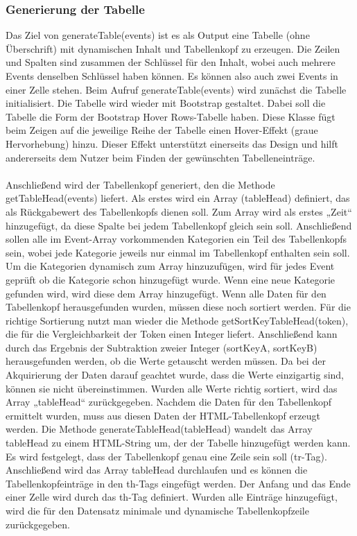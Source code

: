 {\subsubsection{Generierung der Tabelle}
Das Ziel von generateTable(events) ist es als Output eine Tabelle (ohne Überschrift) mit dynamischen Inhalt und Tabellenkopf zu erzeugen. Die Zeilen und Spalten sind zusammen der Schlüssel für den Inhalt, wobei auch mehrere Events denselben Schlüssel haben können. Es können also auch zwei Events in einer Zelle stehen. 
Beim Aufruf generateTable(events) wird zunächst die Tabelle initialisiert. Die Tabelle wird wieder mit Bootstrap gestaltet. Dabei soll die Tabelle die Form der Bootstrap Hover Rows-Tabelle haben. Diese Klasse fügt beim Zeigen auf die jeweilige Reihe der Tabelle einen Hover-Effekt (graue Hervorhebung) hinzu.  Dieser Effekt unterstützt einerseits das Design und hilft andererseits dem Nutzer beim Finden der gewünschten Tabelleneinträge. \\
\\
Anschließend wird der Tabellenkopf generiert, den die Methode getTableHead(events) liefert. Als erstes wird ein Array (tableHead) definiert, das als Rückgabewert des Tabellenkopfs dienen soll. Zum Array wird als erstes „Zeit“ hinzugefügt, da diese Spalte bei jedem Tabellenkopf gleich sein soll. Anschließend sollen alle im Event-Array vorkommenden Kategorien ein Teil des Tabellenkopfs sein, wobei jede Kategorie jeweils nur einmal im Tabellenkopf enthalten sein soll. Um die Kategorien dynamisch zum Array hinzuzufügen, wird für jedes Event geprüft ob die Kategorie schon hinzugefügt wurde. Wenn eine neue Kategorie gefunden wird, wird diese dem Array hinzugefügt. Wenn alle Daten für den Tabellenkopf herausgefunden wurden, müssen diese noch sortiert werden. Für die richtige Sortierung nutzt man wieder die Methode getSortKeyTableHead(token), die für die Vergleichbarkeit der Token einen Integer liefert. Anschließend kann durch das Ergebnis der Subtraktion zweier Integer (sortKeyA, sortKeyB) herausgefunden werden, ob die Werte getauscht werden müssen. Da bei der Akquirierung der Daten darauf geachtet wurde, dass die Werte einzigartig sind, können sie nicht übereinstimmen.
Wurden alle Werte richtig sortiert, wird das Array „tableHead“ zurückgegeben.
Nachdem die Daten für den Tabellenkopf ermittelt wurden, muss aus diesen Daten der HTML-Tabellenkopf erzeugt werden. Die Methode generateTableHead(tableHead) wandelt das Array tableHead zu einem HTML-String um, der der Tabelle hinzugefügt werden kann. Es wird festgelegt, dass der Tabellenkopf genau eine Zeile sein soll (tr-Tag). Anschließend wird das Array tableHead durchlaufen und es können die Tabellenkopfeinträge in den th-Tags eingefügt werden. Der Anfang und das Ende einer Zelle wird durch das th-Tag definiert. Wurden alle Einträge hinzugefügt, wird die für den Datensatz minimale und dynamische Tabellenkopfzeile zurückgegeben.\\
}
